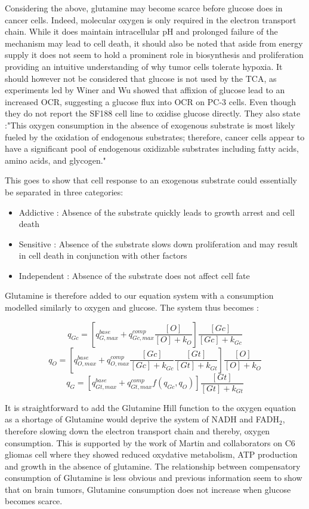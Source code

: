 \documentclass[11pt,a4paper]{article}
\begin{document}
Considering the above, glutamine may become scarce  before glucose does in cancer cells. Indeed, molecular oxygen is only required in the electron transport chain. While it does maintain intracellular pH and prolonged failure of the mechanism may lead to cell death, it should also be noted that aside from energy supply it does not seem to hold  a prominent role in biosynthesis and proliferation providing an intuitive understanding of why tumor cells tolerate hypoxia. It should however not be considered that glucose is not used by the TCA, as experiments led by Winer and Wu showed that affixion of glucose lead to an increased OCR, suggesting a glucose flux into OCR on PC-3 cells. Even though they do not report the SF188 cell line to oxidise glucose directly. They also state :"This oxygen consumption in the absence of exogenous substrate is most likely fueled by the oxidation of endogenous substrates; therefore, cancer cells appear to have a significant pool of endogenous oxidizable substrates including fatty acids, amino acids, and glycogen."\cite{Winer2014}

This goes to show that cell response to an exogenous substrate could essentially be separated in three categories:
\begin{itemize}
\item Addictive : Absence of the substrate quickly leads to growth arrest and cell death
\item Sensitive : Absence of the substrate slows down proliferation and may result in cell death in conjunction with other factors
\item Independent : Absence of the substrate does not affect cell fate
\end{itemize}

Glutamine is therefore added to our equation system with a consumption modelled similarly to oxygen and glucose. The system thus becomes :

\[ q_{Gc} =  [ q_{G,max}^{base} + q_{Gc,max}^{comp} \frac{[O]}{[O]+ k_O}] \frac{[Gc]}{[Gc] + k_{Gc}} \]
\[ q_O =  [ q_{O,max}^{base} + q_{O,max}^{comp} \frac{[Gc]}{[Gc]+ k_{Gc}}\frac{[Gt]}{[Gt]+ k_{Gt}}] \frac{[O]}{[O] + k_O} \] 
\[ q_G =  [ q_{Gt,max}^{base} + q_{Gt,max}^{comp}f(q_{Gc},q_O)] \frac{[Gt]}{[Gt] + k_{Gt}} \]

It is straightforward to add the Glutamine Hill function to the oxygen equation as a shortage of Glutamine would deprive the system of NADH and FADH$_2$, therefore slowing down the electron transport chain and thereby, oxygen consumption. This is supported by the work of Martin and collaborators on C6 gliomas cell where they showed reduced oxydative metabolism, ATP production and growth  in the absence of glutamine.\cite{Martin1999} The relationship between compensatory consumption of Glutamine is less obvious and previous information seem to show that on brain tumors, Glutamine consumption does not increase when glucose becomes scarce.
\end{document}

